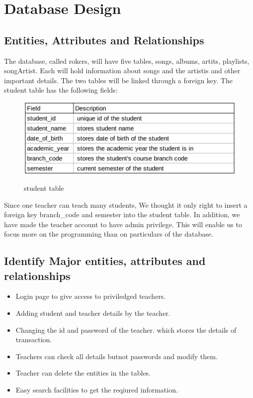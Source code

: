\chapter{Database Design}

\section{Entities, Attributes and Relationships}
The database, called rokers, will have five tables, songs, albums, artits, playlists, songArtist. Each will hold information about songs and the artistis and other important details. The two
tables will be linked through a foreign key. The student table has the following fields:\\
\begin{figure}[H]
\centering
\caption{student table}
\includegraphics[scale=.5]{./StudentTable.png}
\\[0.2in]
\label{fig:Student Table}
\end{figure}
Since one teacher can teach many students, We thought it only right to insert a foreign key
branch\_code and semester into the student table. In addition, we have made the teacher account to have admin privilege. This will
enable us to focus more on the programming than on particulars of the database.\\
\pagebreak
\thispagestyle{fancy}
\section{Identify Major entities, attributes and relationships}
\begin{itemize}
\item Login page to give access to priviledged teachers.
\item Adding student and teacher details by the teacher.
\item Changing the id and password of the teacher.
which stores the details of transaction.
\item Teachers can check all details butnot passwords and modify them.
\item Teacher can delete the entities in the tables.
\item Easy  search facilities to get the reqiured information.
\end{itemize}

